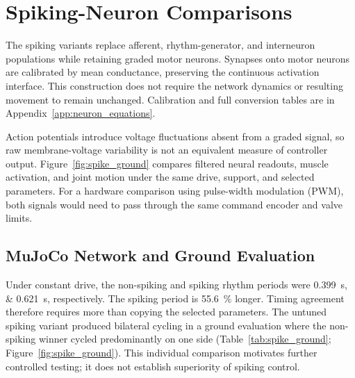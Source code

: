 \section{Spiking-Neuron Comparisons}\label{sec:spiking_methods}\label{sec:spiking_results}\label{sec:disc_spiking}

The spiking variants replace afferent, rhythm-generator, and interneuron populations while retaining graded motor neurons. Synapses onto motor neurons are calibrated by mean conductance, preserving the continuous activation interface. This construction does not require the network dynamics or resulting movement to remain unchanged. Calibration and full conversion tables are in Appendix~\ref{app:neuron_equations}.

Action potentials introduce voltage fluctuations absent from a graded signal, so raw membrane-voltage variability is not an equivalent measure of controller output. Figure~\ref{fig:spike_ground} compares filtered neural readouts, muscle activation, and joint motion under the same drive, support, and selected parameters. For a hardware comparison using pulse-width modulation (PWM), both signals would need to pass through the same command encoder and valve limits.

\subsection{MuJoCo Network and Ground Evaluation}

Under constant drive, the non-spiking and spiking rhythm periods were \qtylist{0.399;0.621}{\second}, respectively. The spiking period is \qty{55.6}{\percent} longer. Timing agreement therefore requires more than copying the selected parameters. The untuned spiking variant produced bilateral cycling in a ground evaluation where the non-spiking winner cycled predominantly on one side (Table~\ref{tab:spike_ground}; Figure~\ref{fig:spike_ground}). This individual comparison motivates further controlled testing; it does not establish superiority of spiking control.

